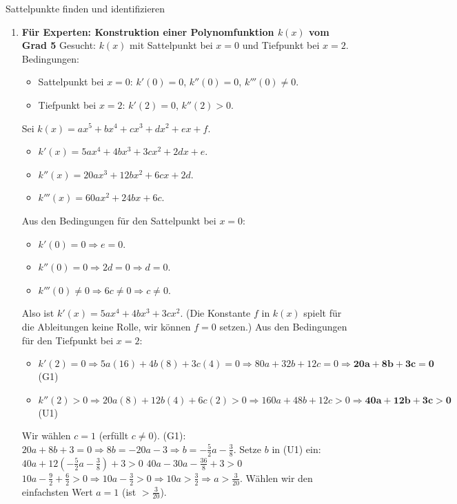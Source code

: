 \begin{loesungsumgebung}{Sattelpunkte finden und identifizieren}
\begin{enumerate}[label=(\alph*)]
 
    \item \textbf{Für Experten: Konstruktion einer Polynomfunktion $k(x)$ vom Grad 5}
    Gesucht: $k(x)$ mit Sattelpunkt bei $x=0$ und Tiefpunkt bei $x=2$.
    Bedingungen:
    \begin{itemize}
        \item Sattelpunkt bei $x=0$: $k'(0)=0$, $k''(0)=0$, $k'''(0) \neq 0$.
        \item Tiefpunkt bei $x=2$: $k'(2)=0$, $k''(2) > 0$.
    \end{itemize}
    Sei $k(x) = ax^5 + bx^4 + cx^3 + dx^2 + ex + f$.
    \begin{itemize}
        \item $k'(x) = 5ax^4 + 4bx^3 + 3cx^2 + 2dx + e$.
        \item $k''(x) = 20ax^3 + 12bx^2 + 6cx + 2d$.
        \item $k'''(x) = 60ax^2 + 24bx + 6c$.
    \end{itemize}
    Aus den Bedingungen für den Sattelpunkt bei $x=0$:
    \begin{itemize}
        \item $k'(0)=0 \Rightarrow e=0$.
        \item $k''(0)=0 \Rightarrow 2d=0 \Rightarrow d=0$.
        \item $k'''(0) \neq 0 \Rightarrow 6c \neq 0 \Rightarrow c \neq 0$.
    \end{itemize}
    Also ist $k'(x) = 5ax^4 + 4bx^3 + 3cx^2$. (Die Konstante $f$ in $k(x)$ spielt für die Ableitungen keine Rolle, wir können $f=0$ setzen.)
    Aus den Bedingungen für den Tiefpunkt bei $x=2$:
    \begin{itemize}
        \item $k'(2)=0 \Rightarrow 5a(16) + 4b(8) + 3c(4) = 0 \Rightarrow 80a + 32b + 12c = 0 \Rightarrow \mathbf{20a + 8b + 3c = 0}$ (G1)
        \item $k''(2)>0 \Rightarrow 20a(8) + 12b(4) + 6c(2) > 0 \Rightarrow 160a + 48b + 12c > 0 \Rightarrow \mathbf{40a + 12b + 3c > 0}$ (U1)
    \end{itemize}
    Wir wählen $c=1$ (erfüllt $c \neq 0$).
    (G1): $20a + 8b + 3 = 0 \Rightarrow 8b = -20a - 3 \Rightarrow b = -\frac{5}{2}a - \frac{3}{8}$.
    Setze $b$ in (U1) ein:
    $40a + 12(-\frac{5}{2}a - \frac{3}{8}) + 3 > 0$
    $40a - 30a - \frac{36}{8} + 3 > 0$
    $10a - \frac{9}{2} + \frac{6}{2} > 0 \Rightarrow 10a - \frac{3}{2} > 0 \Rightarrow 10a > \frac{3}{2} \Rightarrow a > \frac{3}{20}$.
    Wählen wir den einfachsten Wert $a=1$ (ist $>\frac{3}{20}$).

\end{enumerate}
\end{loesungsumgebung}
